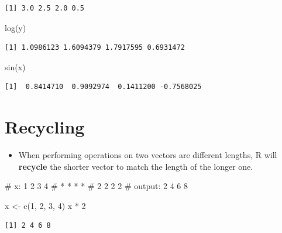 \documentclass[
  letterpaper,
  DIV=11,
  numbers=noendperiod]{scrreprt}
\newenvironment{Shaded}{\begin{snugshade}}{\end{snugshade}}
\newcommand{\CommentTok}[1]{\textcolor[rgb]{0.37,0.37,0.37}{#1}}
\newcommand{\DecValTok}[1]{\textcolor[rgb]{0.68,0.00,0.00}{#1}}
\newcommand{\FunctionTok}[1]{\textcolor[rgb]{0.28,0.35,0.67}{#1}}
\newcommand{\NormalTok}[1]{\textcolor[rgb]{0.00,0.23,0.31}{#1}}
\newcommand{\OtherTok}[1]{\textcolor[rgb]{0.00,0.23,0.31}{#1}}
\newcommand{\SpecialCharTok}[1]{\textcolor[rgb]{0.37,0.37,0.37}{#1}}
\providecommand{\tightlist}{%
  \setlength{\itemsep}{0pt}\setlength{\parskip}{0pt}}\usepackage{longtable,booktabs,array}
\begin{document}
\begin{tcolorbox}
\begin{verbatim}
[1] 3.0 2.5 2.0 0.5
\end{verbatim}

\begin{Shaded}
\begin{Highlighting}[]
\FunctionTok{log}\NormalTok{(y)}
\end{Highlighting}
\end{Shaded}

\begin{verbatim}
[1] 1.0986123 1.6094379 1.7917595 0.6931472
\end{verbatim}

\begin{Shaded}
\begin{Highlighting}[]
\FunctionTok{sin}\NormalTok{(x)}
\end{Highlighting}
\end{Shaded}

\begin{verbatim}
[1]  0.8414710  0.9092974  0.1411200 -0.7568025
\end{verbatim}

\end{tcolorbox}

\section{Recycling}\label{recycling}

\begin{itemize}
\tightlist
\item
  When performing operations on two vectors are different lengths, R
  will \textbf{recycle} the shorter vector to match the length of the
  longer one.
\end{itemize}

\begin{Shaded}
\begin{Highlighting}[]
\CommentTok{\#      x: 1  2  3  4}
\CommentTok{\#         *  *  *  *}
\CommentTok{\#         2  2  2  2}
\CommentTok{\# output: 2  4  6  8}

\NormalTok{x }\OtherTok{\textless{}{-}} \FunctionTok{c}\NormalTok{(}\DecValTok{1}\NormalTok{, }\DecValTok{2}\NormalTok{, }\DecValTok{3}\NormalTok{, }\DecValTok{4}\NormalTok{)}
\NormalTok{x }\SpecialCharTok{*} \DecValTok{2}
\end{Highlighting}
\end{Shaded}

\begin{verbatim}
[1] 2 4 6 8
\end{verbatim}
\end{document}
